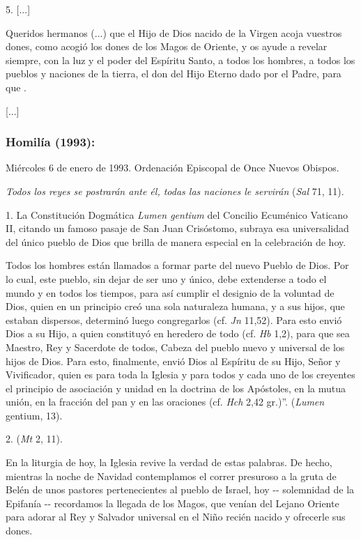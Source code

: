 \begin{body}
	5. {[}...{]}
	
	Queridos hermanos (...) que el Hijo de Dios nacido de la Virgen acoja vuestros dones, como acogió los dones de los Magos de Oriente, y os ayude a revelar siempre, con la luz y el poder del Espíritu Santo, a todos los hombres, a todos los pueblos y naciones de la tierra, el don del Hijo Eterno dado por el Padre, para que .
	
	{[}...{]}
	
	\subsubsection{Homilía (1993): } Miércoles 6 de enero de 1993. Ordenación Episcopal de Once Nuevos Obispos.
	
	\emph{Todos los reyes se postrarán ante él, todas las naciones le servirán} (\emph{Sal} 71, 11).
	
	1. La Constitución Dogmática \emph{Lumen gentium} del Concilio Ecuménico Vaticano II, citando un famoso pasaje de San Juan Crisóstomo, subraya esa universalidad del único pueblo de Dios que brilla de manera especial en la celebración de hoy.
	
	Todos los hombres están llamados a formar parte del nuevo Pueblo de Dios. Por lo cual, este pueblo, sin dejar de ser uno y único, debe extenderse a todo el mundo y en todos los tiempos, para así cumplir el designio de la voluntad de Dios, quien en un principio creó una sola naturaleza humana, y a sus hijos, que estaban dispersos, determinó luego congregarlos (cf. \emph{Jn} 11,52). Para esto envió Dios a su Hijo, a quien constituyó en heredero de todo (cf. \emph{Hb} 1,2), para que sea Maestro, Rey y Sacerdote de todos, Cabeza del pueblo nuevo y universal de los hijos de Dios. Para esto, finalmente, envió Dios al Espíritu de su Hijo, Señor y Vivificador, quien es para toda la Iglesia y para todos y cada uno de los creyentes el principio de asociación y unidad en la doctrina de los Apóstoles, en la mutua unión, en la fracción del pan y en las oraciones (cf. \emph{Hch} 2,42 gr.)''. (\emph{Lumen} gentium, 13).
	
	2.  (\emph{Mt} 2, 11).
	
	En la liturgia de hoy, la Iglesia revive la verdad de estas palabras. De hecho, mientras la noche de Navidad contemplamos el correr presuroso a la gruta de Belén de unos pastores pertenecientes al pueblo de Israel, hoy -\/- solemnidad de la Epifanía -\/- recordamos la llegada de los Magos, que venían del Lejano Oriente para adorar al Rey y Salvador universal en el Niño recién nacido y ofrecerle sus dones.
	

\end{body}
